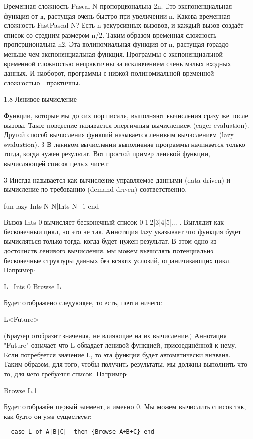 Временная сложность {Pascal N} пропорциональна 2n. Это экспоненциальная функция от n, растущая очень быстро при увеличении n. Какова временная сложность {FastPascal N}? Есть n рекурсивных вызовов, и каждый вызов создаёт список со средним размером n/2. Таким образом временная сложность пропорциональна n2. Эта полиномиальная функция от n, растущая гораздо меньше чем экспоненциальная функция. Программы с экспоненциальной временной сложностью непрактичны за исключением очень малых входных данных. И наоборот, программы с низкой полиномиальной временной сложностью - практичны.

1.8 Ленивое вычисление

Функции, которые мы до сих пор писали, выполняют вычисления сразу же после вызова. Такое поведение называется энергичным вычислением (eager evaluation). Другой способ вычисления функций называется ленивым вычислением (lazy evaluation). 3 В ленивом вычислении выполнение программы начинается только тогда, когда нужен результат. Вот простой пример ленивой функции, вычисляющей список целых чисел:

3 Иногда называется как вычисление управляемое данными (data-driven) и вычисление по-требованию (demand-driven) соответственно.

fun lazy {Ints N}
N|{Ints N+1}
end

Вызов {Ints 0} вычисляет бесконечный список 0|1|2|3|4|5|... . Выглядит как бесконечный цикл, но это не так. Аннотация lazy указывает что функция будет вычисляться только тогда, когда будет нужен результат. В этом одно из достоинств ленивого вычисления: мы можем вычислять потенциально бесконечные структуры данных без всяких условий, ограничивающих цикл. Например:

L={Ints 0}
{Browse L}

Будет отображено следующее, то есть, почти ничего:

L<Future>

(Браузер отобразит значения, не влияющие на их вычисление.) Аннотация "Future" означает что L обладает ленивой функцией, присоединённой к нему. Если потребуется значение L, то эта функция будет автоматически вызвана. Таким образом, для того, чтобы получить результаты, мы должны выполнить что-то, для чего требуется список. Например:

{Browse L.1}

Будет отображён первый элемент, а именно 0. Мы можем вычислить список так, как будто он уже существует:

\begin{lstlisting}
  case L of A|B|C|_ then {Browse A+B+C} end
  \end{lstlisting}

